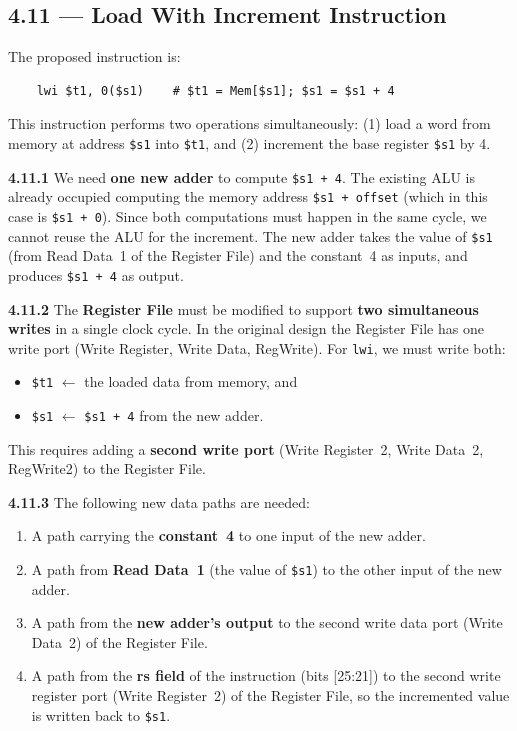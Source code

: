 \subsection*{4.11 --- Load With Increment Instruction}
\hypertarget{sol-4.11}{}

The proposed instruction is:
\begin{verbatim}
    lwi $t1, 0($s1)    # $t1 = Mem[$s1]; $s1 = $s1 + 4
\end{verbatim}

This instruction performs two operations simultaneously: (1) load a word from
memory at address \texttt{\$s1} into \texttt{\$t1}, and (2) increment the base
register \texttt{\$s1} by 4.

\medskip\noindent\textbf{4.11.1}
We need \textbf{one new adder} to compute \texttt{\$s1 + 4}. The existing ALU
is already occupied computing the memory address \texttt{\$s1 + offset}
(which in this case is \texttt{\$s1 + 0}). Since both computations must happen
in the same cycle, we cannot reuse the ALU for the increment. The new adder
takes the value of \texttt{\$s1} (from Read Data~1 of the Register File) and
the constant~4 as inputs, and produces \texttt{\$s1 + 4} as output.

\medskip\noindent\textbf{4.11.2}
The \textbf{Register File} must be modified to support \textbf{two simultaneous
writes} in a single clock cycle. In the original design the Register File has
one write port (Write Register, Write Data, RegWrite). For \texttt{lwi}, we
must write both:
\begin{itemize}
  \item \texttt{\$t1} $\leftarrow$ the loaded data from memory, and
  \item \texttt{\$s1} $\leftarrow$ \texttt{\$s1 + 4} from the new adder.
\end{itemize}
This requires adding a \textbf{second write port} (Write Register~2, Write
Data~2, RegWrite2) to the Register File.

\medskip\noindent\textbf{4.11.3}
The following new data paths are needed:
\begin{enumerate}
  \item A path carrying the \textbf{constant~4} to one input of the new adder.
  \item A path from \textbf{Read Data~1} (the value of \texttt{\$s1}) to the
        other input of the new adder.
  \item A path from the \textbf{new adder's output} to the second write data
        port (Write Data~2) of the Register File.
  \item A path from the \textbf{rs field} of the instruction (bits [25:21]) to
        the second write register port (Write Register~2) of the Register File,
        so the incremented value is written back to \texttt{\$s1}.
\end{enumerate}

